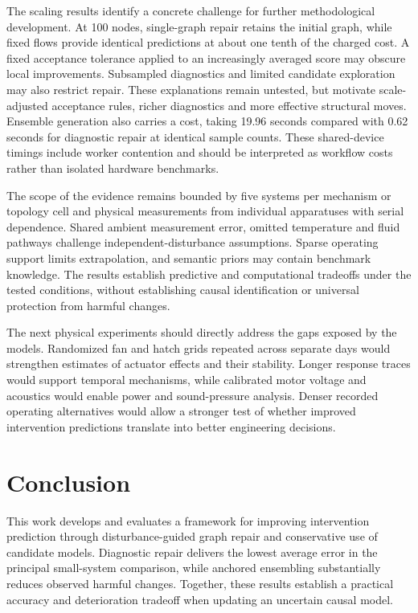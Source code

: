 \documentclass{svproc}
\begin{document}
The scaling results identify a concrete challenge for further methodological
development. At 100 nodes, single-graph repair retains the initial graph,
while fixed flows provide identical predictions at about one tenth of the
charged cost. A fixed acceptance tolerance applied to an increasingly averaged
score may obscure local improvements. Subsampled diagnostics and limited
candidate exploration may also restrict repair. These explanations remain
untested, but motivate scale-adjusted acceptance rules, richer diagnostics
and more effective structural moves. Ensemble generation also carries a cost,
taking 19.96 seconds compared with 0.62 seconds for diagnostic repair at
identical sample counts. These shared-device timings include worker contention
and should be interpreted as workflow costs rather than isolated hardware
benchmarks.

The scope of the evidence remains bounded by five systems per mechanism or
topology cell and physical measurements from individual apparatuses with serial
dependence. Shared ambient measurement error, omitted temperature and fluid
pathways challenge independent-disturbance assumptions. Sparse operating support
limits extrapolation, and semantic priors may contain benchmark knowledge.
The results establish predictive and computational tradeoffs under the tested
conditions, without establishing causal identification or universal protection
from harmful changes.

The next physical experiments should directly address the gaps exposed by the
models. Randomized fan and hatch grids repeated across separate days would
strengthen estimates of actuator effects and their stability. Longer response
traces would support temporal mechanisms, while calibrated motor voltage and
acoustics would enable power and sound-pressure analysis. Denser recorded
operating alternatives would allow a stronger test of whether improved
intervention predictions translate into better engineering decisions.

\section{Conclusion}
This work develops and evaluates a framework for improving intervention
prediction through disturbance-guided graph repair and conservative use of
candidate models. Diagnostic repair delivers the lowest average error in the
principal small-system comparison, while anchored ensembling substantially
reduces observed harmful changes. Together, these results establish a practical
accuracy and deterioration tradeoff when updating an uncertain causal model.
\end{document}
